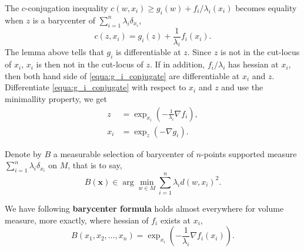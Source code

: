 The $c$-conjugation inequality
$ c(w, x_i) \geq g_i(w) + f_i / \lambda_i (x_i)$
becomes equality when $z$ is a barycenter of $\sum_{i=1}^{n} \lambda_i \delta_{x_i}$,
\begin{equation}
	\label{equa:g_i_conjugate}
	c(z, x_i) = g_i(z) + \frac{1}{\lambda_i} f_i(x_i).
\end{equation}
The lemma above tells that $g_i$ is differentiable at $z$.
Since $z$ is not in the cut-locus of $x_i$,
$x_i$ is then not in the cut-locus of $z$.
If in addition, $f_i / \lambda_i$ has hessian at $x_i$,
then both hand side of \cref{equa:g_i_conjugate} are differentiable at $x_i$ and $z$.
Differentiate \cref{equa:g_i_conjugate} with respect to $x_i$ and $z$ and use the minimallity property,
we get
\begin{align*}
	z   & = \exp_{x_i}( - \frac{1}{\lambda_i} \nabla f_i), \\
	x_i & = \exp_{z}( - \nabla g_i).
\end{align*}


Denote by $B$ a measurable selection of barycenter of
$n$-points supported measure $\sum_{i=1}^{n} \lambda_i \delta_{x_i}$ on $M$,
that is to say,
\[
	B(\boldsymbol{x}) \in \arg \min_{w \in M} \sum_{i=1}^{n} \lambda_i d(w, x_i)^2.
\]


We have following \textbf{barycenter formula} holds almost everywhere for volume measure,
more exactly, where hessian of $f_i$ exists at $x_i$,
\begin{equation}
	\label{formula_barycenter}
	B(x_1, x_2, \ldots, x_n) = \exp_{x_i} (- \frac{1}{\lambda_i} \nabla f_i(x_i)).
\end{equation}

